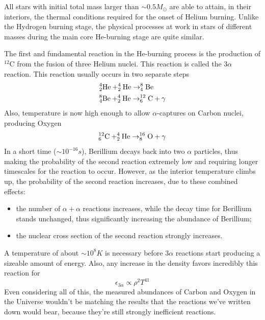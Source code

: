 All stars with initial total mass larger than $\sim 0.5M_{\odot}$ are able to attain, in their interiors, the thermal conditions required for the onset of Helium burning. Unlike the Hydrogen burning stage, the physical processes at work in stars of different masses during the main core He-burning stage are quite similar.
\par The first and fundamental reaction in the He-burning process is the production of $^{12}\text{C}$ from the fusion of three Helium nuclei. This reaction is called the $3\alpha$ reaction. This reaction usually occurs in two separate steps
\begin{align*}
    & \element{He}{4}{2}+\element{He}{4}{2}\to \element{Be}{8}{4}\\
    & \element{Be}{8}{4}+\element{He}{4}{2}\to\element{C}{12}{6}+\gamma
\end{align*}
Also, temperature is now high enough to allow $\alpha$-captures on Carbon nuclei, producing Oxygen 
\begin{equation*}
    \element{C}{12}{6}+\element{He}{4}{2}\to \element{O}{16}{8}+\gamma
\end{equation*}
In a short time ($\sim 10^{-16}\unit{s}$), Berillium decays back into two $\alpha$ particles, thus making the probability of the second reaction extremely low and requiring longer timescales for the reaction to occur. However, as the interior temperature climbs up, the probability of the second reaction increases, due to these combined effects:
\begin{itemize}
    \item the number of $\alpha+\alpha$ reactions increases, while the decay time for Berillium stands unchanged, thus significantly increasing the abundance of Berillium;
    \item the nuclear cross section of the second reaction strongly increases.
\end{itemize} 
\par A temperature of about $\sim 10^{8}\unit{K}$ is necessary before $3\alpha$ reactions start producing a sizeable amount of energy. Also, any increase in the density favors incredibly this reaction for 
\begin{equation*}
    \epsilon_{3\alpha} \propto \rho^{2}T^{41}
\end{equation*}
Even considering all of this, the measured abundances of Carbon and Oxygen in the Universe wouldn't be matching the results that the reactions we've written down would bear, because they're still strongly inefficient reactions.
